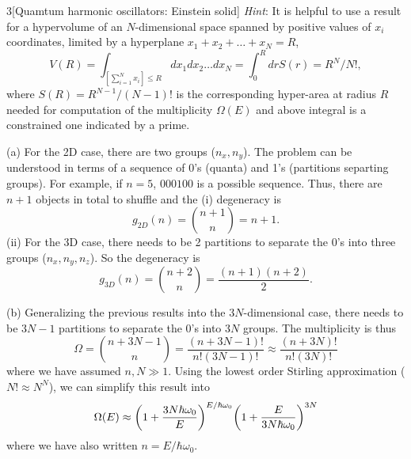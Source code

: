 \documentclass[12pt]{article}
\begin{document}
\begin{problem}{3}[Quamtum harmonic oscillators: Einstein solid]
\textit{Hint}: It is helpful to use a result for a hypervolume of an
$N$-dimensional space spanned by positive values of $x_i$ coordinates, limited
by a hyperplane $x_1+x_2+\hdots+x_N=R$,
\begin{equation}
    V(R)=\int_{[\sum_{i=1}^Nx_i]\leq R}dx_1dx_2\hdots
    dx_N=\int_0^RdrS(r)=R^N/N!,
\end{equation}
where $S(R)=R^{N-1}/(N-1)!$ is the corresponding hyper-area at radius $R$ needed
for computation of the multiplicity $\Omega(E)$ and above integral is a
constrained one indicated by a prime.
\begin{solution}
(a) For the 2D case, there are two groups ($n_x,n_y$). The problem can be
understood in terms of a sequence of 0's (quanta) and 1's (partitions separting
groups). For example, if $n=5$, $000100$ is a possible sequence. Thus, there are
$n+1$ objects in total to shuffle and the (i) degeneracy is
\begin{equation}
    g_{2D}(n)=\binom{n+1}{n}=n+1.
\end{equation}
(ii) For the 3D case, there needs to be 2 partitions to separate the 0's into
three groups ($n_x,n_y,n_z$). So the degeneracy is
\begin{equation}
    g_{3D}(n)=\binom{n+2}{n}=\frac{(n+1)(n+2)}{2}.
\end{equation}

(b) Generalizing the previous results into the $3N$-dimensional case, there
needs to be $3N-1$ partitions to separate the 0's into $3N$ groups. The
multiplicity is thus
\begin{equation}
    \Omega=\binom{n+3N-1}{n}=\frac{(n+3N-1)!}{n!(3N-1)!}
    \approx\frac{(n+3N)!}{n!(3N)!}
\end{equation}
where we have assumed $n,N\gg 1$. Using the lowest order Stirling approximation
($N!\approx N^N$), we can simplify this result into
\begin{equation}
    \Omega(E)\approx\qty(1+\frac{3N\hbar\omega_0}{E})^{E/\hbar\omega_0}
    \qty(1+\frac{E}{3N\hbar\omega_0})^{3N}
\end{equation}
where we have also written $n=E/\hbar\omega_0$.


\end{solution}
\end{problem}
\end{document}
